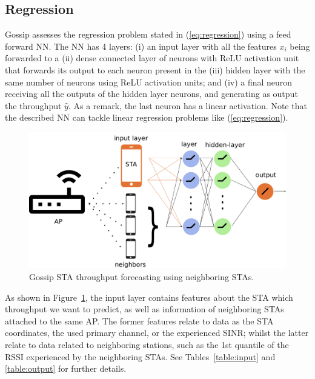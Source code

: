 \documentclass{article}
\begin{document}
\subsection{Regression}
Gossip assesses the regression problem stated in
(\ref{eq:regression}) using a feed forward NN.
The NN has 4 layers: (i) an input layer with
all the features $x_i$ being forwarded to
a (ii) dense connected layer of neurons with
ReLU activation unit that forwards its output
to each neuron present in the (iii) hidden layer
with the same number of neurons using ReLU activation
units; and (iv) a final neuron receiving all the
outputs of the hidden layer neurons, and generating
as output the throughput $\hat{y}$.
As a remark, the last neuron has a linear activation.
Note that the described NN can tackle linear regression problems like
(\ref{eq:regression}).

\begin{figure}[h]
    \centering
    \includegraphics[width=\textwidth]{img/gossip-nn.pdf}
    \caption{Gossip STA throughput forecasting using
    neighboring STAs.}
    \label{fig:gossip}
\end{figure}
As shown in Figure~\ref{fig:gossip}, the input layer
contains features about the STA which throughput we
want to predict, as well as information of neighboring
STAs attached to the same AP.
The former features relate to data as the STA coordinates,
the used primary channel, or the experienced SINR;
whilst the latter relate to data related to neighboring
stations, such as the 1st quantile of the RSSI experienced
by the neighboring STAs.
See Tables~\ref{table:input} and \ref{table:output}
for further details.
\end{document}
